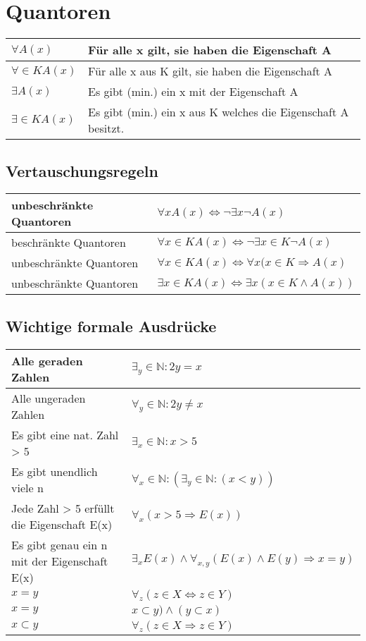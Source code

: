 \documentclass[a4paper,DIV10,12pt,headsepline,smallheadings,halfparskip-]{scrreprt}
\begin{document}
	\section{Quantoren}
	\begin{longtable}{|p{}|p{}|}
		\hline
		\( \forall A(x) \) & Für alle x gilt, sie haben die Eigenschaft A \\
		\hline
		\( \forall \in K A(x) \) & Für alle x aus K gilt, sie haben die Eigenschaft A \\
		\hline
		\( \exists A(x) \) & Es gibt (min.) ein x mit der Eigenschaft A \\
		\hline
		\( \exists \in K A(x) \) & Es gibt (min.) ein x aus K welches die Eigenschaft A besitzt. \\
		\hline
	\end{longtable}
	\pagebreak

	\subsection{Vertauschungsregeln}
	\begin{longtable}{|p{}|p{}|}
		\hline
		unbeschränkte Quantoren & \( \forall x A(x) \Leftrightarrow \neg \exists x \neg A(x) \)\\
		\hline
		beschränkte Quantoren & \( \forall x \in K A(x) \Leftrightarrow \neg \exists x \in K \neg A(x) \)\\
		\hline
		unbeschränkte Quantoren & \( \forall x \in K A(x) \Leftrightarrow \forall x (x \in K \Rightarrow A(x) \)\\
		\hline
		unbeschränkte Quantoren & \( \exists x \in K A(x) \Leftrightarrow \exists x (x \in K \wedge A(x)) \)\\
		\hline
	\end{longtable}
	\subsection{Wichtige formale Ausdrücke}
	\begin{longtable}{p{}|p{}}
		Alle geraden Zahlen & \( \exists_y \in \mathbb{N}: 2y = x \)\\
		\hline
		Alle ungeraden Zahlen & \( \forall_y \in \mathbb{N}: 2y \neq x \)\\
		\hline
		Es gibt eine nat. Zahl > 5 & \(\exists_x \in \mathbb{N}: x > 5 \)\\
		\hline
		Es gibt unendlich viele n & \(\forall_x \in \mathbb{N}: (\exists_y \in \mathbb{N}: (x < y)) \)\\
		\hline
		Jede Zahl > 5 erfüllt die Eigenschaft E(x) & \(\forall_x (x > 5 \Rightarrow E(x)) \)\\
		\hline
		Es gibt genau ein n mit der Eigenschaft E(x) & \(\exists_x E(x) \wedge \forall_{x,y} (E(x) \wedge E(y) \Rightarrow x= y)\) \\
		\hline
		\(x = y\) & \(\forall_z(z \in X \Leftrightarrow z \in Y) \) \\
		\(x = y\) & \(x \subset y) \wedge (y \subset x)\) \\
		\hline
		\(x \subset y\) & \(\forall_z(z \in X \Rightarrow z \in Y) \) \\
	\end{longtable}
\end{document}
